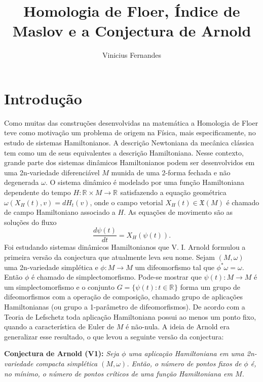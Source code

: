 \documentclass[12pt]{book}
\newcommand{\campohamiltoniano}[1]{X_{H}(#1)}
\newcommand{\campohamiltonianoabrev}{X_{H}}
\newcommand{\campossuaves}[1]{\mathfrak{X}(#1)}
\newcommand{\derivada}[2]{\frac{d #1}{d #2}}
\newcommand{\retacartesianovariedade}{\real{} \times M}
\newcommand{\real}[1]{\mathbb{R}^{#1}}
\newcommand{\reta}{\real{}}
\begin{document}
	
	\title{Homologia de Floer, Índice de Maslov e a Conjectura de Arnold}
	
	\author{Vinicius Fernandes}
	
	\maketitle
	
	\tableofcontents
	
	\chapter*{Introdução}\label{capitulo_introducao}
	Como muitas das construções desenvolvidas na matemática a Homologia de Floer teve como motivação um problema de origem na Física, mais especificamente, no estudo de sistemas Hamiltonianos. A descrição Newtoniana da mecânica clássica tem como um de seus equivalentes a descrição Hamiltoniana. Nesse contexto, grande parte dos sistemas dinâmicos Hamiltonianos podem ser desenvolvidos em uma 2n-variedade diferenciável $M$ munida de uma 2-forma fechada e não degenerada $\omega$. O sistema dinâmico é modelado por uma função Hamiltoniana dependente do tempo $H: \retacartesianovariedade \to \reta$ satisfazendo a equação geométrica $\omega(\campohamiltonianoabrev(t), v) = dH_{t}(v)$, onde o campo vetorial $\campohamiltonianoabrev(t) \in \campossuaves{M}$ é chamado de campo Hamiltoniano associado a $H$. As equações de movimento são as soluções do fluxo
	$$
	\derivada{\psi(t)}{t} = \campohamiltoniano{\psi(t)}.
	$$ 
	Foi estudando sistemas dinâmicos Hamiltonianos que V. I. Arnold formulou a primeira versão da conjectura que atualmente leva seu nome. Sejam $(M, \omega )$ uma 2n-variedade simplética e $\phi:M \to M$ um difeomorfismo tal que $\phi^{*}\omega = \omega$. Então $\phi$ é chamado de simplectomorfismo. Pode-se mostrar que $\psi(t):M\to M$ é um simplectomorfismo e o conjunto $G=\{\psi(t): t \in \reta\}$ forma um grupo de difeomorfismos com a operação de composição, chamado grupo de aplicações Hamiltonianas (ou grupo a 1-parâmetro de difeomorfismos). De acordo com a Teoria de Lefschetz toda aplicação Hamiltoniana possui ao menos um ponto fixo, quando a característica de Euler de $M$ é não-nula. A ideia de Arnold era generalizar esse resultado, o que levou a seguinte versão da conjectura:
	
	\textbf{Conjectura de Arnold (V1):} \textit{Seja $\phi$ uma aplicação Hamiltoniana em uma 2n-variedade compacta simplética $(M, \omega)$. Então, o número de pontos fixos de $\phi$ é, no mínimo, o número de pontos críticos de uma função Hamiltoniana em $M$.}
	
\end{document}
